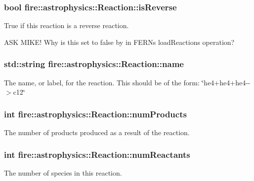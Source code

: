 \subsubsection[{\texorpdfstring{is\+Reverse}{isReverse}}]{\setlength{\rightskip}{0pt plus 5cm}bool fire\+::astrophysics\+::\+Reaction\+::is\+Reverse}\hypertarget{a00242_ae161628da753400b3d2256e2d10a02b9}{}\label{a00242_ae161628da753400b3d2256e2d10a02b9}
True if this reaction is a reverse reaction.

A\+SK M\+I\+K\+E! Why is this set to false by in F\+E\+RN\textquotesingle{}s load\+Reactions operation? 
\subsubsection[{\texorpdfstring{name}{name}}]{\setlength{\rightskip}{0pt plus 5cm}std\+::string fire\+::astrophysics\+::\+Reaction\+::name}\hypertarget{a00242_abb359091e992ad4cb4cde0faacf6021b}{}\label{a00242_abb359091e992ad4cb4cde0faacf6021b}
The name, or label, for the reaction. This should be of the form\+: \char`\"{}he4+he4+he4-\/-\/$>$c12\char`\"{} 
\subsubsection[{\texorpdfstring{num\+Products}{numProducts}}]{\setlength{\rightskip}{0pt plus 5cm}int fire\+::astrophysics\+::\+Reaction\+::num\+Products}\hypertarget{a00242_aa59b550e5dbdd34c9c563e7dfc2cbc1e}{}\label{a00242_aa59b550e5dbdd34c9c563e7dfc2cbc1e}
The number of products produced as a result of the reaction. 
\subsubsection[{\texorpdfstring{num\+Reactants}{numReactants}}]{\setlength{\rightskip}{0pt plus 5cm}int fire\+::astrophysics\+::\+Reaction\+::num\+Reactants}\hypertarget{a00242_a86154569e16ef396c93cdf97c5eaf5b7}{}\label{a00242_a86154569e16ef396c93cdf97c5eaf5b7}
The number of species in this reaction. 
